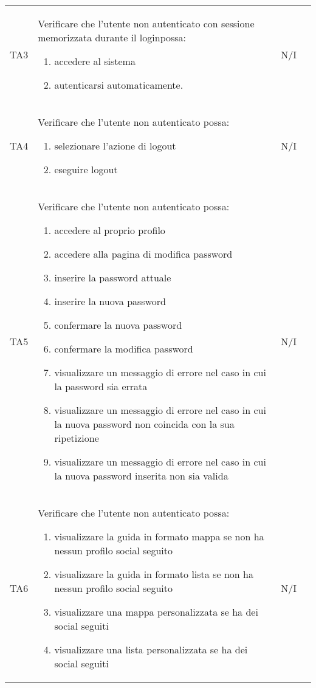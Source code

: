 {\begin{longtable}{C{.115\freewidth} C{.257\freewidth} C{.26\freewidth} C{.4\freewidth}}
    TA3 & Verificare che l’utente non autenticato  con sessione memorizzata durante il loginpossa:\begin{enumerate}
        \item accedere al sistema
        \item autenticarsi automaticamente.
    \end{enumerate} & N/I &\\

    TA4 & Verificare che l’utente non autenticato possa:\begin{enumerate}
        \item selezionare l’azione di logout
        \item eseguire logout
    \end{enumerate} & N/I & \\

    TA5 & Verificare che l’utente non autenticato possa:\begin{enumerate}
        \item accedere al proprio profilo
        \item accedere alla pagina di modifica password
        \item inserire la password attuale
        \item inserire la nuova password
        \item confermare la nuova password
        \item confermare la modifica password
        \item visualizzare un messaggio di errore nel caso in cui la password sia errata
        \item visualizzare un messaggio di errore nel caso in cui la nuova password non coincida con la sua ripetizione
        \item visualizzare un messaggio di errore nel caso in cui la nuova password inserita non sia valida
    \end{enumerate} & N/I & \\

    TA6 & Verificare che l’utente non autenticato possa:\begin{enumerate}
        \item visualizzare la guida in formato mappa se non ha nessun profilo social seguito
        \item visualizzare la guida in formato lista se non ha nessun profilo social seguito
        \item visualizzare una mappa personalizzata se ha dei social seguiti
        \item visualizzare una lista personalizzata se ha dei social seguiti
    \end{enumerate} & N/I & \\


\end{longtable}}
